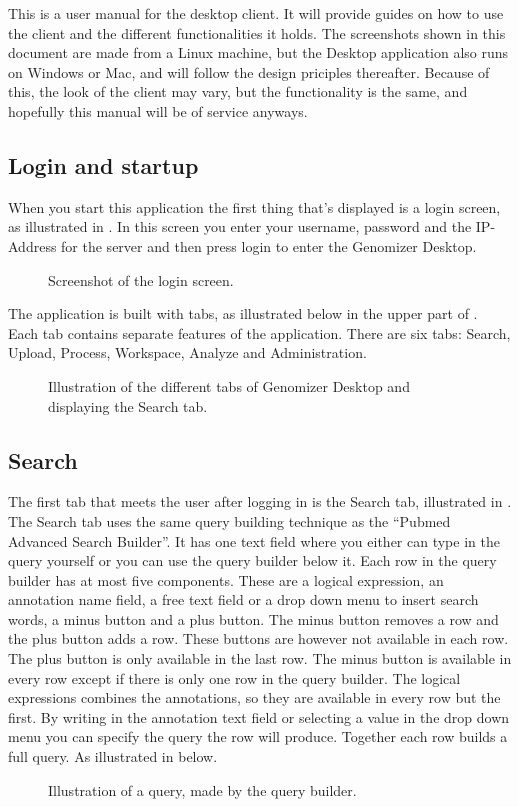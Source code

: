 This is a user manual for the desktop client. It will provide guides on how to use the client and the different functionalities it holds. The screenshots shown in this document are made from a Linux machine, but the Desktop application also runs on Windows or Mac, and will follow the design priciples thereafter. Because of this, the look of the client may vary, but the functionality is the same, and hopefully this manual will be of service anyways. 

\subsection{Login and startup}
When you start this application the first thing that's displayed is a login screen, as illustrated in . In this screen you enter your username, password and the IP-Address for the server and then press login to enter the Genomizer Desktop.

\begin{figure}[htb]
	\caption{Screenshot of the login screen.}
	\label{fig:des_login-pic}
\end{figure}
The application is built with tabs, as illustrated below in the upper part of . Each tab contains separate features of the application. There are six tabs: Search, Upload, Process, Workspace, Analyze and Administration.
\begin{figure}[htb]
	\caption{Illustration of the different tabs of Genomizer Desktop and displaying the Search tab.}
	\label{fig:des_desktop-view}
\end{figure}
\FloatBarrier

\subsection{Search}
The first tab that meets the user after logging in is the Search tab, illustrated in . The Search tab uses the same query building technique as the “Pubmed Advanced Search Builder”. It has one text field where you either can type in the query yourself or you can use the query builder below it. Each row in the query builder has at most five components. These are a logical expression, an annotation name field, a free text field or a drop down menu to insert search words, a minus button and a plus button. The minus button removes a row and the plus button adds a row. These buttons are however not available in each row. The plus button is only available in the last row. The minus button is available in every row except if there is only one row in the query builder. The logical expressions combines the annotations, so they are available in every row but the first.
By writing in the annotation text field or selecting a value in the drop down menu you can specify the query the row will produce. Together each row builds a full query. As illustrated in  below.
\begin{figure}[htb]
	\caption{Illustration of a query, made by the query builder.}
	\label{fig:des_search-query}
\end{figure}
\FloatBarrier

